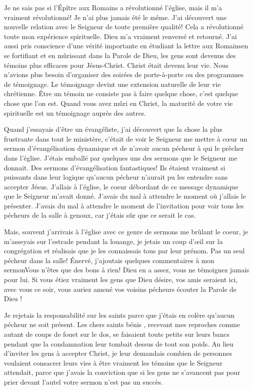 Je ne sais pas si l’Épître aux Romains a révolutionné l’église, mais il m'a vraiment révolutionné! Je n'ai plus jamais été
le même. J'ai découvert une nouvelle relation avec le Seigneur de toute première qualité! Cela a révolutionné toute
mon expérience spirituelle. Dieu m’a vraiment renversé et retourné. J’ai aussi pris conscience d'une vérité importante
en étudiant la lettre aux Romains\frcolon en se fortifiant et en mûrissant dans la Parole de Dieu, les gens sont devenus des
témoins plus efficaces pour Jésus-Christ. Christ était devenu leur vie. Nous n'avions plus besoin d'organiser des
soirées de porte-à-porte ou des programmes de témoignage. Le témoignage devint une extension naturelle de leur
vie chrétienne. Être un témoin ne consiste pas à faire quelque chose, c'est quelque chose que l'on est. Quand vous
avez mûri en Christ, la maturité de votre vie spirituelle est un témoignage auprès des autres.

Quand j'essayais d’être un évangéliste, j’ai découvert que la chose la plus frustrante dans tout le ministère, c’était de
voir le Seigneur me mettre à cœur un sermon d’évangélisation dynamique et de n’avoir aucun pécheur à qui le
prêcher dans l’église. J’étais emballé par quelques uns des sermons que le Seigneur me donnait. Des sermons
d’évangélisation fantastiques! Ils étaient vraiment si puissants dans leur logique qu’aucun pécheur n’aurait pu les
entendre sans accepter Jésus. J'allais à l’église, le coeur débordant de ce message dynamique que le Seigneur m’avait
donné. J'avais du mal à attendre le moment où j’allais le présenter. J'avais du mal à attendre le moment de l’invitation
pour voir tous les pécheurs de la salle à genoux, car j’étais sûr que ce serait le cas.

Mais, souvent j’arrivais à l’église avec ce genre de sermons me brûlant le coeur, je m’asseyais sur l’estrade pendant la
louange, je jetais un coup d'œil sur la congrégation et réalisais que je les connaissais tous par leur prénom. Pas un
seul pécheur dans la salle! Énervé, j’ajoutais quelques commentaires à mon sermon\frcolon\og Vous n’êtes que des bons à
rien! Dieu en a assez, vous ne témoignez jamais pour lui. Si vous étiez vraiment les gens que Dieu désire, vos amis
seraient ici, avec vous ce soir, vous auriez amené vos voisins pécheurs écouter la Parole de Dieu ! \fg{}

Je rejetais la responsabilité sur les saints parce que j’étais en colère qu'aucun pécheur ne soit présent. Les \og chers
saints bénis \fg{}, recevant mes reproches comme autant de coups de fouet sur le dos, se faisaient touts petits sur leurs
bancs pendant que la condamnation leur tombait dessus de tout son poids. Au lieu d’inviter les gens à accepter Christ,
je leur demandais combien de personnes voulaient consacrer leurs vies à être vraiment les témoins que le Seigneur
attendait, parce que j’avais la conviction que si les gens ne s’avancent pas pour prier devant l’autel votre sermon n’est
pas un succès.

